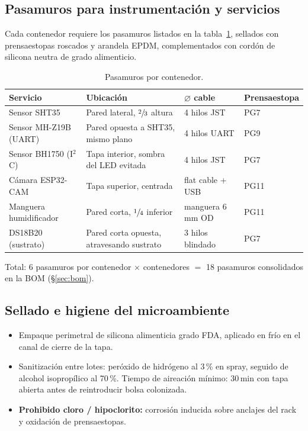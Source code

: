 \subsection{Pasamuros para instrumentación y servicios}
\label{sec:contenedores:pasamuros}

Cada contenedor requiere los pasamuros listados en la
tabla~\ref{tab:pasamuros}, sellados con prensaestopas roscados y
arandela EPDM, complementados con cordón de silicona neutra de grado
alimenticio.

\begin{table}[H]
  \centering
  \caption{Pasamuros por contenedor.}
  \label{tab:pasamuros}
  \begin{tabularx}{\linewidth}{lXll}
    \toprule
    \textbf{Servicio} & \textbf{Ubicación} & \textbf{$\varnothing$ cable} & \textbf{Prensaestopa} \\
    \midrule
    Sensor SHT35           & Pared lateral, $\sfrac{2}{3}$ altura      & 4 hilos JST       & PG7 \\
    Sensor MH-Z19B (UART)  & Pared opuesta a SHT35, mismo plano        & 4 hilos UART      & PG9 \\
    Sensor BH1750 (I$^2$C) & Tapa interior, sombra del LED evitada     & 4 hilos JST       & PG7 \\
    Cámara ESP32-CAM       & Tapa superior, centrada                   & flat cable + USB  & PG11 \\
    Manguera humidificador & Pared corta, $\sfrac{1}{4}$ inferior      & manguera 6\,mm OD & PG11 \\
    DS18B20 (sustrato)     & Pared corta opuesta, atravesando sustrato & 3 hilos blindado  & PG7 \\
    \bottomrule
  \end{tabularx}
\end{table}

Total: 6 pasamuros por contenedor $\times$ \paramNcontenedores{}
contenedores $=$ 18 pasamuros consolidados en la BOM (\S\ref{sec:bom}).

\subsection{Sellado e higiene del microambiente}
\label{sec:contenedores:sellado}

\begin{itemize}[leftmargin=*,itemsep=0pt]
  \item Empaque perimetral de silicona alimenticia grado FDA, aplicado
        en frío en el canal de cierre de la tapa.
  \item Sanitización entre lotes: peróxido de hidrógeno al 3\,\% en
        spray, seguido de alcohol isopropílico al 70\,\%. Tiempo de
        aireación mínimo: 30\,min con tapa abierta antes de
        reintroducir bolsa colonizada.
  \item \textbf{Prohibido cloro / hipoclorito:} corrosión inducida sobre
        anclajes del rack y oxidación de prensaestopas.
\end{itemize}

